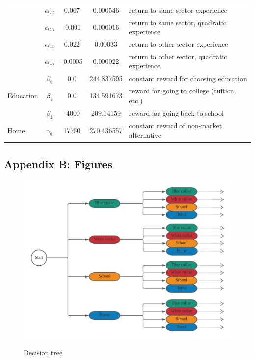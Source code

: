 \begin{table}[H]
{\begin{tabular}{lcccl}
                             & $\alpha_{22}$ & 0.067   & 0.000546       & return to same sector experience             \\
                             & $\alpha_{23}$ & -0.001  & 0.000016       & return to same sector, quadratic experience  \\
                             & $\alpha_{24}$ & 0.022   & 0.00033        & return to other sector experience            \\
                             & $\alpha_{25}$ & -0.0005 & 0.000022       & return to other sector, quadratic experience \\ \hline
\multirow{3}{*}{Education}    & $\beta_0$     & 0.0  & 244.837595 & constant reward for choosing education \\
                             & $\beta_1$     & 0.0     & 134.591673     & reward for going to college (tuition, etc.)  \\
                             & $\beta_2$     & -4000   & 209.14159      & reward for going back to school              \\ \hline
Home                         & $\gamma_0$     & 17750   & 270.436557     & constant reward of non-market alternative    \\ \hline
\end{tabular}%
}
\end{table}









\newpage
\subsection{Appendix B: Figures}
\thispagestyle{plain} %




\vspace{10mm} %
\begin{figure}[H]
	\caption{Decision tree \label{fig:1}}
	\centering
	\includegraphics[scale=1]{./resources/kw94-decisiontree}
	\label{fig:corr}
\end{figure}

